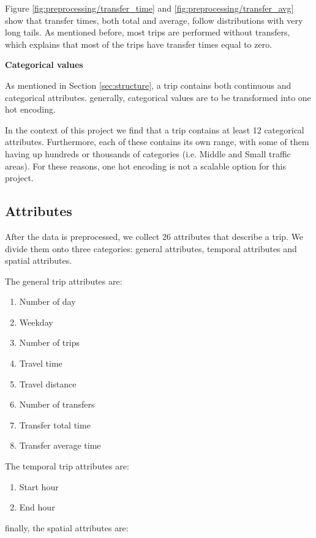 \documentclass{article}
\begin{document}
Figure \ref{fig:preprocessing/transfer_time} and \ref{fig:preprocessing/transfer_avg} show that transfer times, both total and average, follow distributions with very long tails. As mentioned before, most trips are performed without transfers, which explains that most of the trips have transfer times equal to zero. %


\textbf{Categorical values}

As mentioned in Section \ref{sec:structure}, a trip contains both continuous and categorical attributes. generally, categorical values are to be transformed into one hot encoding. 

In the context of this project we find that a trip contains at least 12 categorical attributes. Furthermore, each of these contains its own range, with some of them having up hundreds or thousands of categories (i.e. Middle and Small traffic areas). For these reasons, one hot encoding is not a scalable option for this project.


\subsection{Attributes}
\label{sec:attributes}
After the data is preprocessed, we collect 26 attributes that describe a trip. We divide them onto three categories: general attributes, temporal attributes and spatial attributes. 

The general trip attributes are: 

\begin{enumerate}
\item Number of day
\item Weekday
\item Number of trips
\item Travel time
\item Travel distance
\item Number of transfers
\item Transfer total time
\item Transfer average time
\end{enumerate}

The temporal trip attributes are:
 
\begin{enumerate}
\item Start hour
\item End hour
\end{enumerate}

finally, the spatial attributes are:
\end{document}
